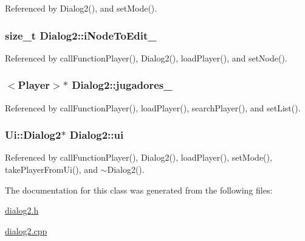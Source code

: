 Referenced by Dialog2(), and set\+Mode().

\hypertarget{class_dialog2_a8fb4a8ae79e9aa259a175b61bef0a977}{}
\subsubsection[{i\+Node\+To\+Edit\+\_\+}]{\setlength{\rightskip}{0pt plus 5cm}size\+\_\+t Dialog2\+::i\+Node\+To\+Edit\+\_\+\hspace{0.3cm}{\ttfamily [private]}}\label{class_dialog2_a8fb4a8ae79e9aa259a175b61bef0a977}


Referenced by call\+Function\+Player(), Dialog2(), load\+Player(), and set\+Node().

\hypertarget{class_dialog2_a1727e93199b6480451889b6522c626a2}{}
\subsubsection[{jugadores\+\_\+}]{$<${\bf Player}$>$$\ast$ Dialog2\+::jugadores\+\_\+\hspace{0.3cm}{\ttfamily [private]}}\label{class_dialog2_a1727e93199b6480451889b6522c626a2}


Referenced by call\+Function\+Player(), load\+Player(), search\+Player(), and set\+List().

\hypertarget{class_dialog2_a321aadfcfc152fc97dc63391f08216fa}{}
\subsubsection[{ui}]{\setlength{\rightskip}{0pt plus 5cm}Ui\+::\+Dialog2$\ast$ Dialog2\+::ui\hspace{0.3cm}{\ttfamily [private]}}\label{class_dialog2_a321aadfcfc152fc97dc63391f08216fa}


Referenced by call\+Function\+Player(), Dialog2(), load\+Player(), set\+Mode(), take\+Player\+From\+Ui(), and $\sim$\+Dialog2().



The documentation for this class was generated from the following files\+:\begin{DoxyCompactItemize}
\item 
\hyperlink{dialog2_8h}{dialog2.\+h}\item 
\hyperlink{dialog2_8cpp}{dialog2.\+cpp}\end{DoxyCompactItemize}
